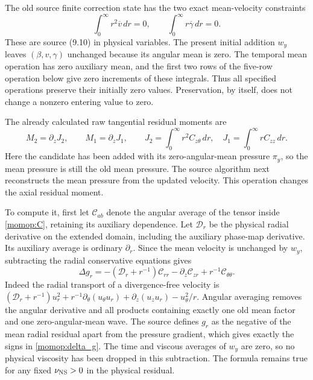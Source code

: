 The old source finite correction state has the two exact mean-velocity
constraints
\[
 \int_0^\infty r^2\overline v\,dr=0,\qquad
 \int_0^\infty r\overline\gamma\,dr=0 .
\]
These are source (9.10) in physical variables. The present initial
addition $w_y$ leaves $(\beta,v,\gamma)$ unchanged because its angular
mean is zero. The temporal mean operation has zero auxiliary mean,
and the first two rows of the five-row operation below give zero
increments of these integrals. Thus all specified operations preserve
their initially zero values. Preservation, by itself, does not change
a nonzero entering value to zero.

The already calculated raw tangential residual moments are
\[
 M_2=\partial_zJ_2,\qquad M_1=\partial_zJ_1,\qquad
 J_2=\int_0^\infty r^2C_{z\theta}\,dr,\quad
 J_1=\int_0^\infty rC_{zz}\,dr.
\]
Here the candidate has been added with its zero-angular-mean pressure
$\pi_y$, so the mean pressure is still the old mean pressure.
The source algorithm next reconstructs the mean pressure from the
updated velocity. This operation changes the axial residual moment.

To compute it, first let $\mathcal C_{ab}$ denote the angular average
of the tensor inside \eqref{momop:C}, retaining its auxiliary dependence.
Let $\mathcal D_r$ be the physical radial derivative on the extended
domain, including the auxiliary phase-map derivative. Its auxiliary
average is ordinary $\partial_r$. Since the mean velocity is unchanged
by $w_y$, subtracting the radial conservative equations gives
\begin{equation}\label{momop:delta_g}
 \Delta g_r=-(\mathcal D_r+r^{-1})\mathcal C_{rr}
                   -\partial_z\mathcal C_{zr}
                   +r^{-1}\mathcal C_{\theta\theta}.
\end{equation}
Indeed the radial transport of a divergence-free velocity is
$(\mathcal D_r+r^{-1})u_r^2+
r^{-1}\partial_\theta(u_\theta u_r)+
\partial_z(u_zu_r)-u_\theta^2/r$.
Angular averaging removes the angular derivative and all products
containing exactly one old mean factor and one zero-angular-mean wave.
The source defines $g_r$ as the negative of the mean radial residual
apart from the pressure gradient, which gives exactly the signs in
\eqref{momop:delta_g}. The time and viscous averages of $w_y$
are zero, so no physical viscosity has been dropped in this subtraction.
The formula remains true for any fixed $\nu_{\rm NS}>0$ in the
physical residual.

